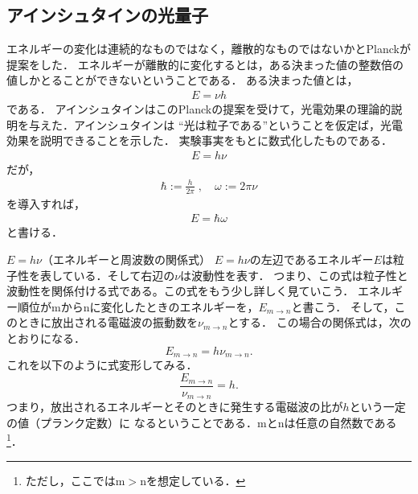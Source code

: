        \subsection{アインシュタインの光量子}
            エネルギーの変化は連続的なものではなく，離散的なものではないかとPlanckが提案をした．
            エネルギーが離散的に変化するとは，ある決まった値の整数倍の値しかとることができないということである．
            ある決まった値とは，
                \begin{align}
                    E=\nu h
                \end{align}
            である．
            アインシュタインはこのPlanckの提案を受けて，光電効果の理論的説明を与えた．アインシュタインは
            “光は粒子である”ということを仮定ば，光電効果を説明できることを示した．
            実験事実をもとに数式化したものである．
                \begin{align}
                    E=h\nu
                \end{align}
            だが，
                \begin{align*}
                    \hbar := \frac{h}{2\pi}\;,\quad\omega:= 2\pi\nu
                \end{align*}
            を導入すれば，
                \begin{align}
                    E=\hbar\omega
                \end{align}
            と書ける．

            \begin{memo}{$E=h\nu$（エネルギーと周波数の関係式）}
                $E=h\nu$の左辺であるエネルギー$E$は粒子性を表している．そして右辺の$\nu$は波動性を表す．
                つまり、この式は粒子性と波動性を関係付ける式である。この式をもう少し詳しく見ていこう．
                エネルギー順位がmからnに変化したときのエネルギーを，${E}_{m \rightarrow n}$と書こう．
                そして，このときに放出される電磁波の振動数を${\nu}_{m \rightarrow n}$とする．
                この場合の関係式は，次のとおりになる．
                \[
                    {E}_{m \rightarrow n}=h{\nu}_{m \rightarrow n}.
                \]
                これを以下のように式変形してみる．
                \[
                    \frac{{E}_{m \rightarrow n}}{{\nu}_{m \rightarrow n}} = h.
                \]
                つまり，放出されるエネルギーとそのときに発生する電磁波の比が$h$という一定の値（プランク定数）に
                なるということである．mとnは任意の自然数である
                    \footnote{
                        ただし，ここではm$>$nを想定している．
                    }．
                
            \end{memo}

